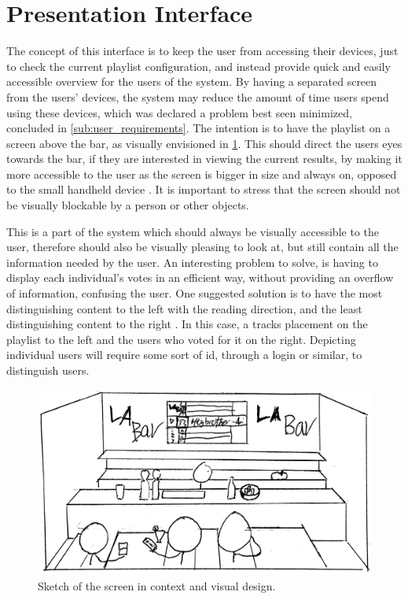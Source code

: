 \section{Presentation Interface}

The concept of this interface is to keep the user from accessing their devices, just to check the current playlist configuration, and instead provide quick and easily accessible overview for the users of the system. By having a separated screen from the users' devices, the system may reduce the amount of time users spend using these devices, which was declared a problem best seen minimized, concluded in \cref{sub:user_requirements}. The intention is to have the playlist on a screen above the bar, as visually envisioned in \cref{fig:PresentationInterface}. This should direct the users eyes towards the bar, if they are interested in viewing the current results, by making it more accessible to the user as the screen is bigger in size and always on, opposed to the small handheld device \cite{DEB} . It is important to stress that the screen should not be visually blockable by a person or other objects.

This is a part of the system which should always be visually accessible to the user, therefore should also be visually pleasing to look at, but still contain all the information needed by the user. An interesting problem to solve, is having to display each individual's votes in an efficient way, without providing an overflow of information, confusing the user. One suggested solution is to have the most distinguishing content to the left with the reading direction, and the least distinguishing content to the right \cite{material}. In this case, a tracks placement on the playlist to the left and the users who voted for it on the right. Depicting individual users will require some sort of id, through a login or similar, to distinguish users.

\begin{figure}[hbtp]
  \centering
  \includegraphics[width=1.0\linewidth]{Images/presentation.png}
  \caption{Sketch of the screen in context and visual design.}\label{fig:PresentationInterface}
\end{figure}

